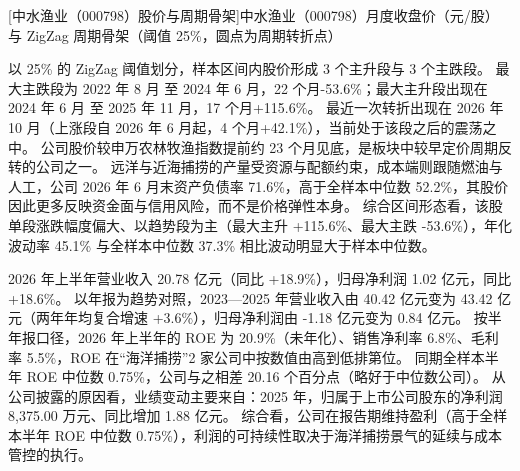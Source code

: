 \begin{center}
\begin{minipage}{\textwidth}\centering
{}

[中水渔业（000798）股价与周期骨架]{中水渔业（000798）月度收盘价（元/股）与 ZigZag 周期骨架（阈值 25\%，圆点为周期转折点）}
\end{minipage}
\end{center}

 以 25\% 的 ZigZag 阈值划分，样本区间内股价形成 3 个主升段与 3 个主跌段。 最大主跌段为 2022 年 8 月 至 2024 年 6 月，22 个月-53.6\%；最大主升段出现在 2024 年 6 月 至 2025 年 11 月，17 个月+115.6\%。 最近一次转折出现在 2026 年 10 月（上涨段自 2026 年 6 月起，4 个月+42.1\%），当前处于该段之后的震荡之中。 公司股价较申万农林牧渔指数提前约 23 个月见底，是板块中较早定价周期反转的公司之一。 远洋与近海捕捞的产量受资源与配额约束，成本端则跟随燃油与人工，公司 2026 年 6 月末资产负债率 71.6\%，高于全样本中位数 52.2\%，其股价因此更多反映资金面与信用风险，而不是价格弹性本身。 综合区间形态看，该股单段涨跌幅度偏大、以趋势段为主（最大主升 +115.6\%、最大主跌 -53.6\%），年化波动率 45.1\% 与全样本中位数 37.3\% 相比波动明显大于样本中位数。

 2026 年上半年营业收入 20.78 亿元（同比 +18.9\%），归母净利润 1.02 亿元，同比 +18.6\%。 以年报为趋势对照，2023---2025 年营业收入由 40.42 亿元变为 43.42 亿元（两年年均复合增速 +3.6\%），归母净利润由 -1.18 亿元变为 0.84 亿元。 按半年报口径，2026 年上半年的 ROE 为 20.9\%（未年化）、销售净利率 6.8\%、毛利率 5.5\%，ROE 在“海洋捕捞”2 家公司中按数值由高到低排第位。 同期全样本半年 ROE 中位数 0.75\%，公司与之相差 20.16 个百分点（略好于中位数公司）。 从公司披露的原因看，业绩变动主要来自：2025 年，归属于上市公司股东的净利润 8,375.00 万元、同比增加 1.88 亿元。 综合看，公司在报告期维持盈利（高于全样本半年 ROE 中位数 0.75\%），利润的可持续性取决于海洋捕捞景气的延续与成本管控的执行。

